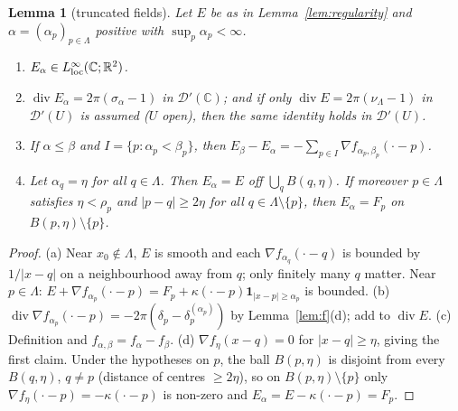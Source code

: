 \documentclass[11pt]{article}
\newtheorem{lemma}[theorem]{Lemma}
\theoremstyle{definition}
\theoremstyle{remark}
\newcommand{\R}{\mathbb R}
\newcommand{\C}{\mathbb C}
\newcommand{\Lam}{\Lambda}
\DeclareMathOperator{\Div}{div}
\begin{document}
\begin{lemma}[truncated fields]\label{lem:truncfield}
Let $E$ be as in Lemma~\ref{lem:regularity} and $\alpha=(\alpha_p)_{p\in\Lam}$ positive with $\sup_p\alpha_p<\infty$.
\begin{enumerate}[label=(\alph*)]
\item $E_\alpha\in L^\infty_{\rm loc}(\C;\R^2)$.
\item $\Div E_\alpha=2\pi(\sigma_\alpha-1)$ in $\mathcal D'(\C)$; and if only $\Div E=2\pi(\nu_\Lam-1)$ in $\mathcal D'(U)$ is
assumed ($U$ open), then the same identity holds in $\mathcal D'(U)$.
\item If $\alpha\le\beta$ and $I=\{p:\alpha_p<\beta_p\}$, then $E_\beta-E_\alpha=-\sum_{p\in I}\nabla f_{\alpha_p,\beta_p}(\cdot-p)$.
\item Let $\alpha_q=\eta$ for all $q\in\Lam$.  Then $E_\alpha=E$ off $\bigcup_qB(q,\eta)$.  If moreover $p\in\Lam$ satisfies $\eta<\rho_p$ and $|p-q|\ge2\eta$ for all $q\in\Lam\setminus\{p\}$, then $E_\alpha=F_p$ on $B(p,\eta)\setminus\{p\}$.
\end{enumerate}
\end{lemma}
\begin{proof}
(a) Near $x_0\notin\Lam$, $E$ is smooth and each $\nabla f_{\alpha_q}(\cdot-q)$ is bounded by $1/|x-q|$ on a neighbourhood
away from $q$; only finitely many $q$ matter.  Near $p\in\Lam$: $E+\nabla f_{\alpha_p}(\cdot-p)=F_p+\kappa(\cdot-p)\mathbf 1_{|x-p|\ge\alpha_p}$
is bounded.  (b) $\Div\nabla f_{\alpha_p}(\cdot-p)=-2\pi(\delta_p-\delta_p^{(\alpha_p)})$ by Lemma~\ref{lem:f}(d); add to $\Div E$.
(c) Definition and $f_{\alpha,\beta}=f_\alpha-f_\beta$.  (d) $\nabla f_\eta(x-q)=0$ for $|x-q|\ge\eta$, giving the first claim.  Under the hypotheses on $p$, the ball $B(p,\eta)$ is disjoint from every $B(q,\eta)$, $q\ne p$ (distance of centres $\ge2\eta$), so on $B(p,\eta)\setminus\{p\}$ only $\nabla f_\eta(\cdot-p)=-\kappa(\cdot-p)$ is non-zero and $E_\alpha=E-\kappa(\cdot-p)=F_p$.
\end{proof}
\end{document}

